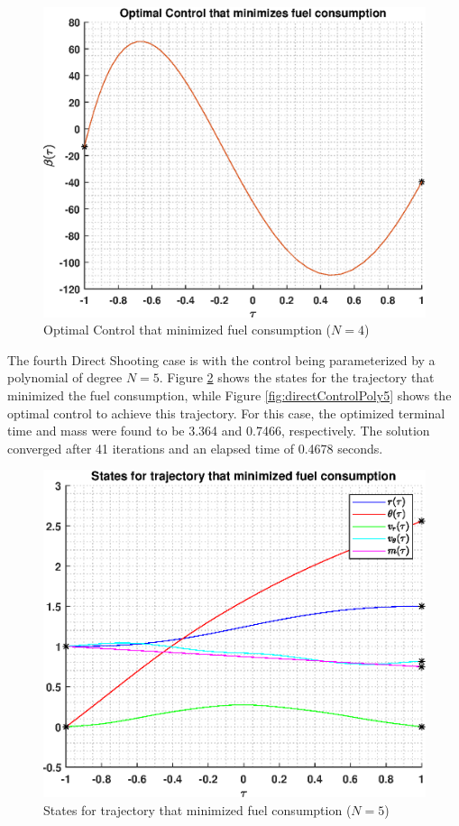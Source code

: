 \documentclass[]{article}
\begin{document}
\begin{figure}
	\centering
	\includegraphics[scale=0.75]{directControlPoly4.eps}
	\caption{Optimal Control that minimized fuel consumption (\(N = 4\))}
	\label{fig:directControlPoly4}
\end{figure}
\vspace{2mm}\newline 
The fourth Direct Shooting case is with the control being parameterized by a polynomial of degree \(N = 5\). Figure \ref{fig:directStatesPoly5} shows the states for the trajectory that minimized the fuel consumption, while Figure \ref{fig:directControlPoly5} shows the optimal control to achieve this trajectory. For this case, the optimized terminal time and mass were found to be 3.364 and 0.7466, respectively. The solution converged after 41 iterations and an elapsed time of 0.4678 seconds.
\begin{figure}
	\centering
	\includegraphics[scale=0.75]{directStatesPoly5.eps}
	\caption{States for trajectory that minimized fuel consumption (\(N = 5\))}
	\label{fig:directStatesPoly5}
\end{figure}
\end{document}
